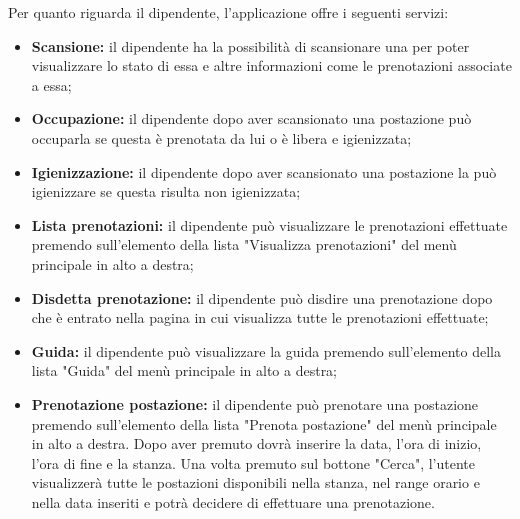 Per quanto riguarda il dipendente, l'applicazione offre i seguenti servizi:
\begin{itemize}
	\item \textbf{Scansione:} il dipendente ha la possibilità di scansionare una  per poter visualizzare lo stato di essa e altre informazioni come le prenotazioni associate a essa; \\
	\item \textbf{Occupazione:} il dipendente dopo aver scansionato una postazione può occuparla se questa è prenotata da lui o è libera e igienizzata; \\
	\item \textbf{Igienizzazione:} il dipendente dopo aver scansionato una postazione la può igienizzare se questa risulta non igienizzata; \\
	\item \textbf{Lista prenotazioni:} il dipendente può visualizzare le prenotazioni effettuate premendo sull'elemento della lista "Visualizza prenotazioni" del menù principale in alto a destra; \\
	\item \textbf{Disdetta prenotazione:} il dipendente può disdire una prenotazione dopo che è entrato nella pagina in cui visualizza tutte le prenotazioni effettuate; \\
	\item \textbf{Guida:} il dipendente può visualizzare la guida premendo sull'elemento della lista "Guida" del menù principale in alto a destra; \\
	\item \textbf{Prenotazione postazione:} il dipendente può prenotare una postazione premendo sull'elemento della lista "Prenota postazione" del menù principale in alto a destra.
	Dopo aver premuto dovrà inserire la data, l'ora di inizio, l'ora di fine e la stanza.
	Una volta premuto sul bottone "Cerca", l'utente visualizzerà tutte le postazioni disponibili nella stanza, nel range orario e nella data inseriti e potrà decidere di effettuare una prenotazione. \\	
\end{itemize}

